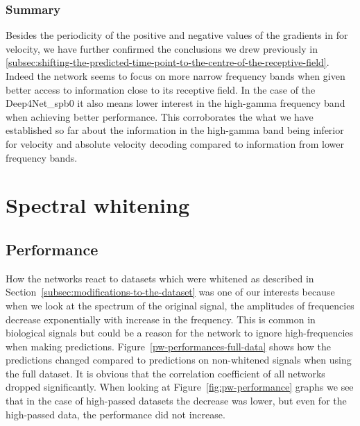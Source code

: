 \subsubsection{Summary}\label{subsubsec:across-shiftig-summary}
Besides the periodicity of the positive and negative values of the gradients in for velocity, we have further confirmed the conclusions we drew previously in \ref{subsec:shifting-the-predicted-time-point-to-the-centre-of-the-receptive-field}. 
Indeed the network seems to focus on more narrow frequency bands when given better access to information close to its receptive field.
In the case of the Deep4Net\_spb0 it also means lower interest in the high-gamma frequency band when achieving better performance.
This corroborates the what we have established so far about the information in the high-gamma band being inferior for velocity and absolute velocity decoding compared to information from lower frequency bands. 


\section{Spectral whitening}\label{sec:spectral-whitening}


\subsection{Performance}\label{subsec:pw-performance}
How the networks react to datasets which were whitened as described in Section~\ref{subsec:modifications-to-the-dataset} was one of our interests because when we look at the spectrum of the original signal, the amplitudes of frequencies decrease exponentially with increase in the frequency.
This is common in biological signals but could be a reason for the network to ignore high-frequencies when making predictions. Figure~\ref{pw-performances-full-data} shows how the predictions changed compared to predictions on non-whitened signals when using the full dataset.
It is obvious that the correlation coefficient of all networks dropped significantly.
When looking at Figure~\ref{fig:pw-performance} graphs we see that in the case of high-passed datasets the decrease was lower, but even for the high-passed data, the performance did not increase.

